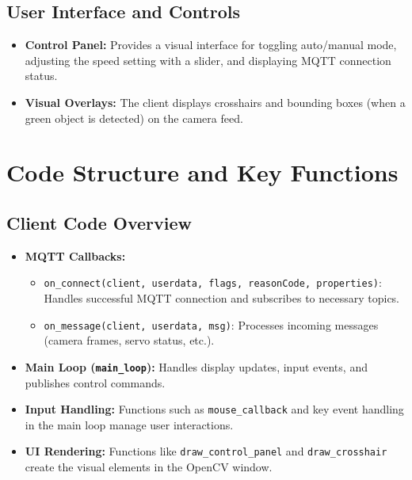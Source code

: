 \documentclass[12pt]{article}
\begin{document}
\subsection{User Interface and Controls}
\begin{itemize}[leftmargin=*, label={--}]
    \item \textbf{Control Panel:} Provides a visual interface for toggling auto/manual mode, adjusting the speed setting with a slider, and displaying MQTT connection status.
    \item \textbf{Visual Overlays:} The client displays crosshairs and bounding boxes (when a green object is detected) on the camera feed.
\end{itemize}

\section{Code Structure and Key Functions}

\subsection{Client Code Overview}
\begin{itemize}[leftmargin=*, label={--}]
    \item \textbf{MQTT Callbacks:} 
    \begin{itemize}[leftmargin=*, label={*}]
        \item \texttt{on\_connect(client, userdata, flags, reasonCode, properties)}: Handles successful MQTT connection and subscribes to necessary topics.
        \item \texttt{on\_message(client, userdata, msg)}: Processes incoming messages (camera frames, servo status, etc.).
    \end{itemize}
    \item \textbf{Main Loop (\texttt{main\_loop}):} Handles display updates, input events, and publishes control commands.
    \item \textbf{Input Handling:} Functions such as \texttt{mouse\_callback} and key event handling in the main loop manage user interactions.
    \item \textbf{UI Rendering:} Functions like \texttt{draw\_control\_panel} and \texttt{draw\_crosshair} create the visual elements in the OpenCV window.
\end{itemize}
\end{document}
